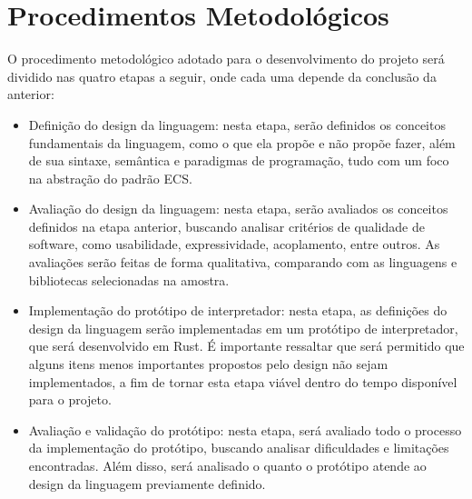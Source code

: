 \section{Procedimentos Metodológicos}

O procedimento metodológico adotado para o desenvolvimento do projeto será dividido nas quatro etapas a seguir, onde cada uma depende da conclusão da anterior:

\begin{itemize}
    \item Definição do design da linguagem: nesta etapa, serão definidos os conceitos fundamentais da linguagem, como o que ela propõe e não propõe fazer, além de sua sintaxe, semântica e paradigmas de programação, tudo com um foco na abstração do padrão ECS.
    \item Avaliação do design da linguagem: nesta etapa, serão avaliados os conceitos definidos na etapa anterior, buscando analisar critérios de qualidade de software, como usabilidade, expressividade, acoplamento, entre outros. As avaliações serão feitas de forma qualitativa, comparando com as linguagens e bibliotecas selecionadas na amostra.
    \item Implementação do protótipo de interpretador: nesta etapa, as definições do design da linguagem serão implementadas em um protótipo de interpretador, que será desenvolvido em Rust. É importante ressaltar que será permitido que alguns itens menos importantes propostos pelo design não sejam implementados, a fim de tornar esta etapa viável dentro do tempo disponível para o projeto.
    \item Avaliação e validação do protótipo: nesta etapa, será avaliado todo o processo da implementação do protótipo, buscando analisar dificuldades e limitações encontradas. Além disso, será analisado o quanto o protótipo atende ao design da linguagem previamente definido.
\end{itemize}
